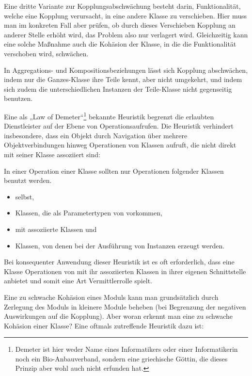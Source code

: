 \pagebreak %

Eine dritte Variante zur Kopplungsabschwächung besteht darin, Funktionalität, welche eine Kopplung verursacht, in eine andere Klasse zu verschieben. Hier muss man im konkreten Fall aber prüfen, ob durch dieses Verschieben Kopplung an anderer Stelle erhöht wird, das Problem also nur verlagert wird. Gleichzeitig kann eine solche Maßnahme auch die Kohäsion der Klasse, in die die Funktionalität verschoben wird, schwächen.

In Aggregations- und Kompositionsbeziehungen lässt sich Kopplung abschwächen, indem nur die Ganzes-Klasse ihre Teile kennt, aber nicht umgekehrt, und indem sich zudem die unterschiedlichen Instanzen der Teile-Klasse nicht gegenseitig benutzen.

Eine 
 als „Law of Demeter“\footnote{Demeter ist hier weder Name eines Informatikers oder einer Informatikerin noch ein Bio-Anbauverband, sondern eine griechische Göttin, die dieses Prinzip aber wohl auch nicht erfunden hat.} bekannte Heuristik begrenzt die erlaubten Dienstleister auf der Ebene von Operationsaufrufen. Die Heuristik verhindert insbesondere, dass ein Objekt durch Navigation über mehrere Objektverbindungen hinweg Operationen von Klassen aufruft, die nicht direkt mit seiner Klasse assoziiert sind:

In einer Operation  einer Klasse  sollten nur Operationen folgender Klassen benutzt werden.

\begin{itemize}
	\item {} selbst,
	\item Klassen, die als Parametertypen von  vorkommen,
	\item mit  assoziierte Klassen und
	\item Klassen, von denen bei der Ausführung von  Instanzen erzeugt werden.
\end{itemize}

Bei konsequenter Anwendung dieser Heuristik ist es oft erforderlich, dass eine Klasse Operationen von mit ihr assoziierten Klassen in ihrer eigenen Schnittstelle anbietet und somit eine Art Vermittlerrolle spielt.


Eine zu schwache Kohäsion eines Moduls kann man grundsätzlich durch Zerlegung des Moduls in kleinere Module beheben (bei Begrenzung der negativen Auswirkungen auf die Kopplung). Aber woran erkennt man eine zu schwache Kohäsion einer Klasse? Eine oftmals zutreffende Heuristik dazu ist:

